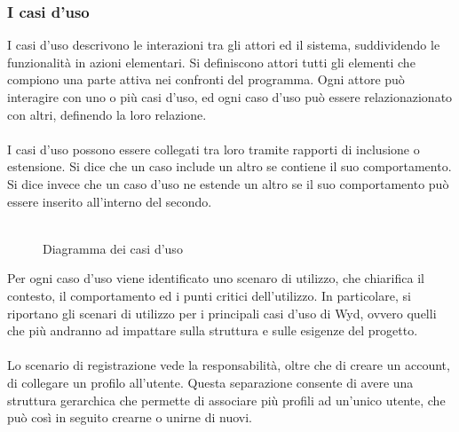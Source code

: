 \clearpage


\subsubsection{I casi d’uso}

I casi d’uso descrivono le interazioni tra gli attori ed il sistema, suddividendo le funzionalità in azioni elementari.
Si definiscono attori tutti gli elementi che compiono una parte attiva nei confronti del programma.
Ogni attore può interagire con uno o più casi d'uso, 
ed ogni caso d'uso può essere relazionazionato con altri, definendo la loro relazione.\\
\\
I casi d'uso possono essere collegati tra loro tramite rapporti di inclusione o estensione.
Si dice che un caso include un altro se contiene il suo comportamento.
Si dice invece che un caso d'uso ne estende un altro se il suo comportamento può essere inserito all'interno del secondo.\\
\\

\begin{figure}[htb]
    \centering
    \caption{Diagramma dei casi d'uso}
\end{figure}
\clearpage
Per ogni caso d'uso viene identificato uno scenaro di utilizzo, che chiarifica il contesto, il comportamento ed i punti critici dell'utilizzo.
In particolare, si riportano gli scenari di utilizzo per i principali casi d'uso di Wyd, ovvero quelli
che più andranno ad impattare sulla struttura e sulle esigenze del progetto.\\
\\
Lo scenario di registrazione vede la responsabilità, oltre che di creare un account, di collegare un profilo all'utente.
Questa separazione consente di avere una struttura gerarchica che permette di associare più profili ad un'unico utente, che può così in seguito crearne o unirne di nuovi.\\

